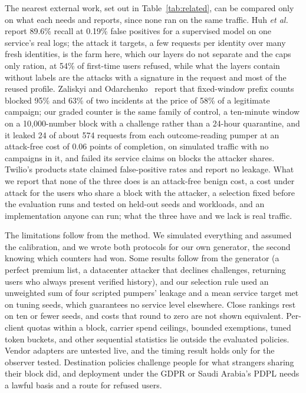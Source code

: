\documentclass{IEEEoj}
\begin{document}
The nearest external work, set out in Table~\ref{tab:related}, can be compared only on what each needs and reports, since none ran on the same traffic. Huh \textit{et al.}~\cite{huh2025ait} report 89.6\% recall at 0.19\% false positives for a supervised model on one service's real logs; the attack it targets, a few requests per identity over many fresh identities, is the farm here, which our layers do not separate and the caps only ration, at 54\% of first-time users refused, while what the layers contain without labels are the attacks with a signature in the request and most of the reused profile. Zaliskyi and Odarchenko~\cite{zaliskyi2026ait} report that fixed-window prefix counts blocked 95\% and 63\% of two incidents at the price of 58\% of a legitimate campaign; our graded counter is the same family of control, a ten-minute window on a 10,000-number block with a challenge rather than a 24-hour quarantine, and it leaked 24 of about 574 requests from each outcome-reading pumper at an attack-free cost of 0.06 points of completion, on simulated traffic with no campaigns in it, and failed its service claims on blocks the attacker shares. Twilio's products state claimed false-positive rates and report no leakage. What we report that none of the three does is an attack-free benign cost, a cost under attack for the users who share a block with the attacker, a selection fixed before the evaluation runs and tested on held-out seeds and workloads, and an implementation anyone can run; what the three have and we lack is real traffic.

The limitations follow from the method. We simulated everything and assumed the calibration, and we wrote both protocols for our own generator, the second knowing which counters had won. Some results follow from the generator (a perfect premium list, a datacenter attacker that declines challenges, returning users who always present verified history), and our selection rule used an unweighted sum of four scripted pumpers' leakage and a mean service target met on tuning seeds, which guarantees no service level elsewhere. Close rankings rest on ten or fewer seeds, and costs that round to zero are not shown equivalent. Per-client quotas within a block, carrier spend ceilings, bounded exemptions, tuned token buckets, and other sequential statistics lie outside the evaluated policies. Vendor adapters are untested live, and the timing result holds only for the observer tested. Destination policies challenge people for what strangers sharing their block did, and deployment under the GDPR or Saudi Arabia's PDPL needs a lawful basis and a route for refused users.
\end{document}
